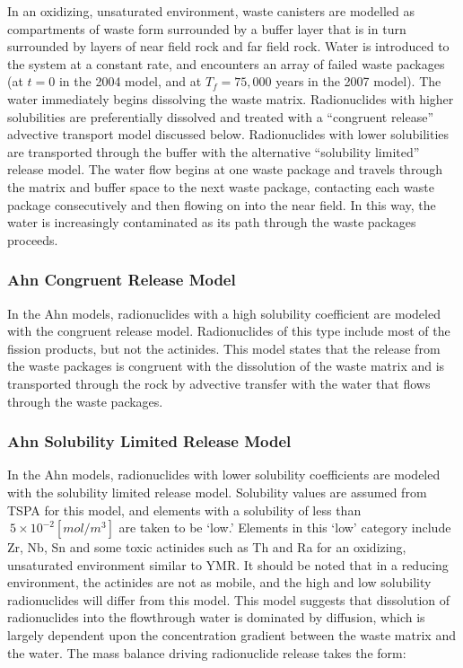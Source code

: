 In an oxidizing, unsaturated environment, waste canisters are modelled as 
compartments of waste form surrounded by a buffer layer that is in turn 
surrounded by layers of near field rock and far field rock. Water is introduced 
to the system at a constant rate, and encounters an array of failed waste 
packages (at $t=0$ in the 2004 model, and at $T_f=75,000$ years in the 2007 model). 
The water immediately begins dissolving the waste matrix.  Radionuclides with higher 
solubilities are preferentially dissolved and treated with a ``congruent 
release'' advective transport model discussed
below. Radionuclides with lower solubilities are transported through the buffer with
the alternative ``solubility limited'' release model. The water flow begins at
one waste package and travels through the matrix and buffer space to the next
waste package, contacting each waste package consecutively and then flowing on
into the near field. In this way, the water is increasingly contaminated as its
path through the waste packages proceeds.  

\subsubsection{Ahn Congruent Release Model} 

In the Ahn models, radionuclides with a high solubility coefficient are modeled with
the congruent release model.  Radionuclides of this type include most of the fission
products, but not the actinides. This model states that the release from the
waste packages is congruent with the dissolution of the waste matrix and is
transported through the rock by advective transfer with the water that flows
through the waste packages.  

\subsubsection{Ahn Solubility Limited Release Model}

In the Ahn models, radionuclides with lower solubility coefficients are modeled with
the solubility limited release model.  Solubility values are assumed from TSPA
for this model, and elements with a solubility of less than $~5\times 10^{-2}
[mol/m^3]$ are taken to be
`low.' Elements in this `low' category include Zr, Nb, Sn and some toxic actinides 
such as Th and Ra for an oxidizing, unsaturated environment similar to \gls{YMR}.
It should be noted that in a reducing environment, the actinides are not as mobile, 
and the high and low solubility radionuclides will differ from this model.
This model suggests that dissolution of radionuclides into the flowthrough water 
is dominated by diffusion, which is largely dependent upon the concentration 
gradient between the waste matrix and the water. The mass balance driving 
radionuclide release takes the form:

